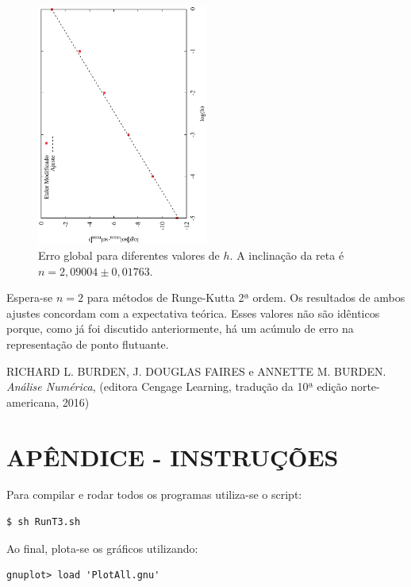 \documentclass[brazilian, 12pt, a4paper, final]{article}
\begin{document}
\begin{figure}[htbp]
  \centering
  \includegraphics[width=0.50\textwidth,angle=-90]{h_erros_eul.eps}
  \caption{Erro global para diferentes valores de $h$. A inclinação da reta é $n=2,09004\pm0,01763$.}
  \label{fig:heul}
\end{figure}

Espera-se $n=2$ para métodos de Runge-Kutta 2ª ordem. Os resultados de ambos ajustes concordam com a expectativa teórica. Esses valores não são idênticos porque, como já foi discutido anteriormente, há um acúmulo de erro na representação de ponto flutuante.

\begin{thebibliography}{n}
 RICHARD L. BURDEN, J. DOUGLAS FAIRES e ANNETTE M. BURDEN. {\em Análise Numérica}, (editora Cengage Learning,  tradução da 10ª edição norte-americana, 2016)
  
\end{thebibliography}

\appendix
\section{APÊNDICE - INSTRUÇÕES}

Para compilar e rodar todos os programas utiliza-se o script:
\begin{verbatim}
$ sh RunT3.sh
\end{verbatim}

Ao final, plota-se os gráficos utilizando:
\begin{verbatim}
gnuplot> load 'PlotAll.gnu'
\end{verbatim}
\end{document}

